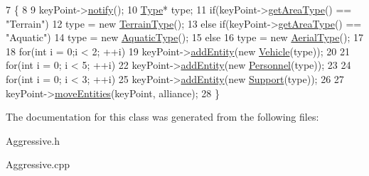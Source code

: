 \begin{DoxyCode}
7                                                                     \{
8 
9     keyPoint->\hyperlink{classKeyPoint_a5b21817babe753b2b684d70479f3eaf2}{notify}();
10     \hyperlink{classType}{Type}* type;
11     \textcolor{keywordflow}{if}(keyPoint->\hyperlink{classKeyPoint_a2e7f0accc7c9be244da25bb1189c5a1d}{getAreaType}() == \textcolor{stringliteral}{"Terrain"})
12         type = \textcolor{keyword}{new} \hyperlink{classTerrainType}{TerrainType}();
13     \textcolor{keywordflow}{else} \textcolor{keywordflow}{if}(keyPoint->\hyperlink{classKeyPoint_a2e7f0accc7c9be244da25bb1189c5a1d}{getAreaType}() == \textcolor{stringliteral}{"Aquatic"})
14         type = \textcolor{keyword}{new} \hyperlink{classAquaticType}{AquaticType}();
15     \textcolor{keywordflow}{else}
16         type = \textcolor{keyword}{new} \hyperlink{classAerialType}{AerialType}();
17         
18     \textcolor{keywordflow}{for}(\textcolor{keywordtype}{int} i = 0;i < 2; ++i)
19         keyPoint->\hyperlink{classKeyPoint_aad6d7102c8e3d11fe5f29b163f50dbc3}{addEntity}(\textcolor{keyword}{new} \hyperlink{classVehicle}{Vehicle}(type));
20 
21     \textcolor{keywordflow}{for}(\textcolor{keywordtype}{int} i = 0; i < 5; ++i)
22         keyPoint->\hyperlink{classKeyPoint_aad6d7102c8e3d11fe5f29b163f50dbc3}{addEntity}(\textcolor{keyword}{new} \hyperlink{classPersonnel}{Personnel}(type));
23 
24     \textcolor{keywordflow}{for}(\textcolor{keywordtype}{int} i = 0; i < 3; ++i)
25         keyPoint->\hyperlink{classKeyPoint_aad6d7102c8e3d11fe5f29b163f50dbc3}{addEntity}(\textcolor{keyword}{new} \hyperlink{classSupport}{Support}(type));
26     
27     keyPoint->\hyperlink{classKeyPoint_a3fc425554378989ba83ebd22f7305f14}{moveEntities}(keyPoint, alliance);
28 \}
\end{DoxyCode}


The documentation for this class was generated from the following files\+:\begin{DoxyCompactItemize}
\item 
Aggressive.\+h\item 
Aggressive.\+cpp\end{DoxyCompactItemize}
